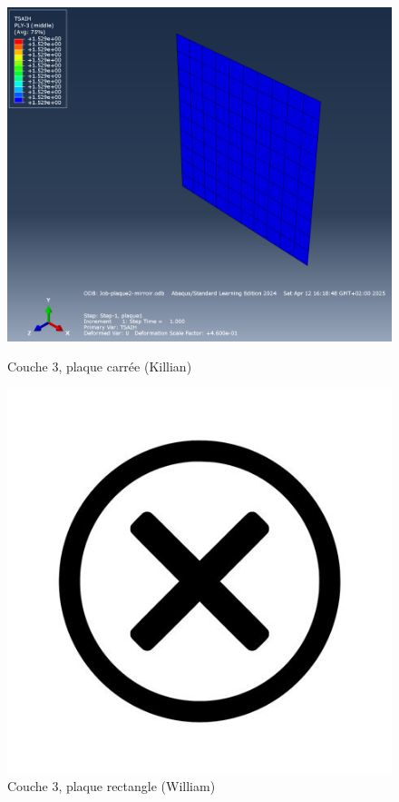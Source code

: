 \documentclass[a4paper,12pt]{article}
\begin{document}
\begin{figure}[H]
	\centering
	\begin{minipage}{0.495\textwidth}
		\centering
		\includegraphics[width=\textwidth]{media/K_P2_L3-6_12042025.png} %
		\caption{Couche 3, plaque carrée (Killian)}
		\label{fig:image1}
	\end{minipage}
	\hfill
	\begin{minipage}{0.495\textwidth}
		\centering
		\includegraphics[width=\textwidth]{media/no-image.jpg} %
		\caption{Couche 3, plaque rectangle (William)}
		\label{fig:image2}
	\end{minipage}
\end{figure}
\end{document}
